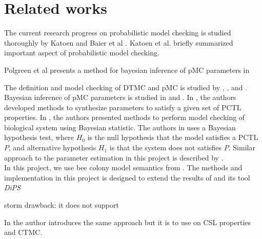 \chapter{Related works}

The current research progress on probabilistic model checking is studied thoroughly by Katoen and Baier et al \cite{baier2008principles}. Katoen et al. \cite{katoen2016probabilistic} briefly summarized important aspect of probabilistic model checking.

Polgreen et al \cite{polgreen2016data} presents a method for bayesian inference of pMC parameters in


The definition and model checking of DTMC and pMC is studied by
\cite{baier2008principles}, \cite{hutschenreiter2017parametric}, and \cite{katoen2016probabilistic}.\\
Bayesian inference of pMC parameters is studied in \cite{polgreen2016data} and
\cite{jha2009bayesian}. In \cite{polgreen2016data}, the authors developed
methods to synthesize parameters to satisfy a given set of PCTL properties. In
\cite{jha2009bayesian}, the authors presented methods to perform model checking
of biological system using Bayesian statistic. The authors in
\cite{jha2009bayesian} uses a Bayesian hypothesis test, where $H_0$ is the null
hypothesis that the model satisfies a PCTL $P$, and alternative hypothesis $H_1$
is that the system does not satisfies $P$. Similar approach to the parameter
estimation in this project is described by \cite{hussain2015automated}.\\
In this project, we use bee colony model semantics from \cite{hajnal2019data}.
The methods and implementation in this project is designed to extend the results
of \cite{hajnal2019data} and its tool \textit{DiPS}

storm drawback: it does not support


In \cite{molyneux2020abc} the author introduces the same approach but it is to use on CSL properties and CTMC.